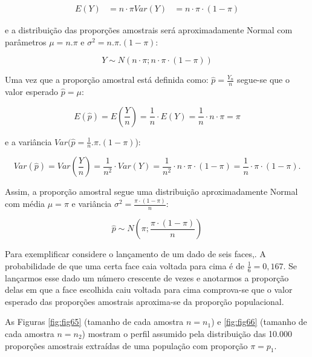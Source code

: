 \documentclass[
]{book}
\begin{document}
\hfill\break

\begin{align*}
E(Y) & =n \cdot \pi
Var(Y) & =n \cdot \pi \cdot (1-\pi)
\end{align*}

\hfill\break

e a distribuição das proporções amostrais será aproximadamente Normal com parâmetros \(\mu=n.\pi\) e \(\sigma^{2}=n.\pi.(1-\pi)\):

\hfill\break

\[
Y \sim N \left( n\cdot\pi ; n\cdot\pi\cdot(1-\pi)  \right)
\]

\hfill\break

Uma vez que a proporção amostral está definida como: \(\hat{p} = \frac{Y_{n}}{n}\) segue-se que o valor esperado \(\hat{p}=\mu\):

\hfill\break

\[
E(\hat{p}) = E(\frac{Y}{n}) = \frac{1}{n} \cdot E(Y) = \frac{1}{n} \cdot n \cdot \pi = \pi
\]

\hfill\break

e a variância \(Var(\hat{p}=\frac{1}{n}.\pi.(1-\pi)\)):

\hfill\break

\[
Var(\hat{p}) = Var(\frac{Y}{n}) = \frac{1}{n^{2}} \cdot Var(Y) = \frac{1}{n^{2}} \cdot n \cdot \pi \cdot (1-\pi) =   \frac{1}{n} \cdot \pi \cdot (1-\pi ).
\]

\hfill\break

Assim, a proporção amostral segue uma distribuição aproximadamente Normal com média \(\mu=\pi\) e variância \(\sigma^{2}=\frac{\pi \cdot (1- \pi)}{n}\):

\hfill\break

\[
\hat{p}  \sim  N \left(\pi ;  \frac{\pi \cdot (1- \pi) }{n} \right)
\]

\hfill\break
Para exemplificar considere o lançamento de um dado de seis faces,. A probabilidade de que uma certa face caia voltada para cima é de \(\frac{1}{6}=0,167\). Se lançarmos esse dado um número crescente de vezes e anotarmos a proporção delas em que a face escolhida caiu voltada para cima comprova-se que o valor esperado das proporções amostrais aproxima-se da proporção populacional.

\hfill\break

As Figuras \ref{fig:fig65} (tamanho de cada amostra \(n=n_1\)) e \ref{fig:fig66} (tamanho de cada amostra \(n=n_2\)) mostram o perfil assumido pela distribuição das 10.000 proporções amostrais extraídas de uma população com proporção \(\pi=p_1\).
\end{document}
